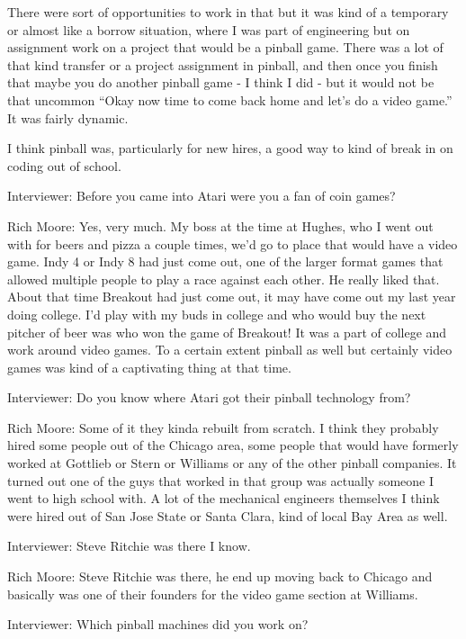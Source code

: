 There were sort of opportunities to work in that but it was kind of a temporary or almost like a borrow situation, where I was part of engineering but on assignment work on a project that would be a pinball game. There was a lot of that kind transfer or a project assignment in pinball, and then once you finish that maybe you do another pinball game - I think I did - but it would not be that uncommon “Okay now time to come back home and let's do a video game.” It was fairly dynamic.

I think pinball was, particularly for new hires, a good way to kind of break in on coding out of school.

\textcolor{interviewer}{Interviewer:} Before you came into Atari were you a fan of coin games?

\textcolor{interviewee}{Rich Moore:} Yes, very much. My boss at the time at Hughes, who I went out with for beers and pizza a couple times, we'd go to place that would have a video game. Indy 4 or Indy 8 had just come out, one of the larger format games that allowed multiple people to play a race against each other. He really liked that. About that time Breakout had just come out, it may have come out my last year doing college. I’d play with my buds in college and who would buy the next pitcher of beer was who won the game of Breakout! It was a part of college and work around video games. To a certain extent pinball as well but certainly video games was kind of a captivating thing at that time.

\textcolor{interviewer}{Interviewer:} Do you know where Atari got their pinball technology from?

\textcolor{interviewee}{Rich Moore:} Some of it they kinda rebuilt from scratch. I think they probably hired some people out of the Chicago area, some people that would have formerly worked at Gottlieb or Stern or Williams or any of the other pinball companies. It turned out one of the guys that worked in that group was actually someone I went to high school with. A lot of the mechanical engineers themselves I think were hired out of San Jose State or Santa Clara, kind of local Bay Area as well.

\textcolor{interviewer}{Interviewer:} Steve Ritchie was there I know.

\textcolor{interviewee}{Rich Moore:} Steve Ritchie was there, he end up moving back to Chicago and basically was one of their founders for the video game section at Williams.

\textcolor{interviewer}{Interviewer:} Which pinball machines did you work on?

